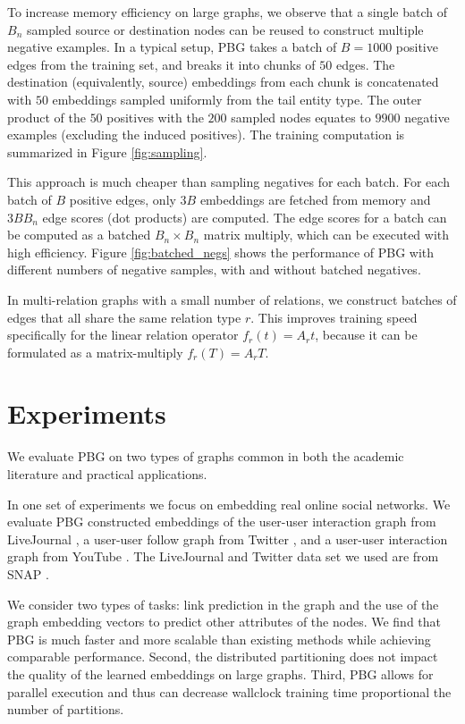 \documentclass{article}
\begin{document}
To increase memory efficiency on large graphs, we observe that a single batch of $B_n$ sampled source or destination nodes can be reused to construct multiple negative examples. In a typical setup, PBG takes a batch of $B=1000$ positive edges from the training set, and breaks it into chunks of $50$ edges. The destination (equivalently, source) embeddings from each chunk is concatenated with $50$ embeddings sampled uniformly from the tail entity type. The outer product of the $50$ positives with the $200$ sampled nodes equates to $9900$ negative examples (excluding the induced positives). The training computation is summarized in Figure \ref{fig:sampling}.

This approach is much cheaper than sampling negatives for each batch. For each batch of $B$ positive edges, only $3B$ embeddings are fetched from memory and $3 B B_n$ edge scores (dot products) are computed. The edge scores for a batch can be computed as a batched $B_n \times B_n$ matrix multiply, which can be executed with high efficiency. Figure \ref{fig:batched_negs} shows the performance of PBG with different numbers of negative samples, with and without batched negatives.

In multi-relation graphs with a small number of relations, we construct batches of edges that all share the same relation type $r$. This improves training speed specifically for the linear relation operator $f_r(t)=A_r t$, because it can be formulated as a matrix-multiply $f_r(T)=A_r T.$ 



\section{Experiments}
We evaluate PBG on two types of graphs common in both the academic literature and practical applications. 

In one set of experiments we focus on embedding real online social networks. We evaluate PBG constructed embeddings of the user-user interaction graph from LiveJournal \cite{backstrom2006group} \cite{leskovec2009community}, a user-user follow graph from Twitter \cite{kwak2010twitter} \cite{boldi2004webgraph} \cite{boldi2011layered}, and a user-user interaction graph from YouTube \cite{tang2009scalable}. The LiveJournal and Twitter data set we used are from SNAP \cite{snapnets}.

We consider two types of tasks: link prediction in the graph and the use of the graph embedding vectors to predict other attributes of the nodes. We find that PBG is much faster and more scalable than existing methods while achieving comparable performance. Second, the distributed partitioning does not impact the quality of the learned embeddings on large graphs. Third, PBG allows for parallel execution and thus can decrease wallclock training time proportional the number of partitions.
\end{document}
